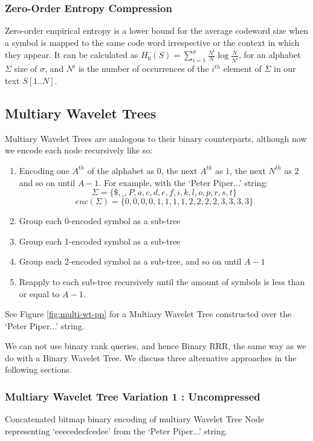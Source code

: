 \subsubsection{Zero-Order Entropy Compression}
\label{sec:entropy}
Zero-order empirical entropy is a lower bound for the average codeword size
when a symbol is mapped to the same code word irrespective or the context in
which they appear. It can be calculated as $H_0(S) = \sum_{i = 1}^{\sigma}
\frac{N^i}{N} \log \frac{N}{N^i}$, for an alphabet $\Sigma$ size of $\sigma$, 
and $N^i$ is the number of occurrences of the $i^{th}$ element of $\Sigma$ in 
our text $S[1..N]$. 



\clearpage
\subsection{Multiary Wavelet Trees}
Multiary Wavelet Trees are analogous to their binary counterparts, although now we encode each node recursively like so:

\begin{enumerate}
    \item Encoding one $A^{th}$ of the alphabet as $0$, the next $A^{th}$ as 
		$1$, the next $N^{th}$ as $2$ and so on until $A-1$. For example, with 
		the `Peter Piper...' string:
		$$\Sigma = \{ \$, \_, P, a, c, d, e, f, i, k, l, o, p, r, s, t \}$$
	   	$$enc(\Sigma) = \{  0,  0, 0, 0, 1, 1, 1, 1, 2, 2, 2, 2, 3, 3, 3, 3 \}$$
    \item Group each 0-encoded symbol as a sub-tree
    \item Group each 1-encoded symbol as a sub-tree
    \item Group each 2-encoded symbol as a sub-tree, and so on until $A-1$
    \item Reapply to each sub-tree recursively until the amount of symbols is
	less than or equal to $A - 1$.
\end{enumerate}

See Figure \ref{fig:multi-wt-pp} for a Multiary Wavelet Tree constructed over
the `Peter Piper...' string.

We can not use binary rank queries, and hence Binary RRR, the same way as we do 
with a Binary Wavelet Tree. We discuss three alternative approaches in the 
following sections.

\subsubsection{Multiary Wavelet Tree Variation 1 : Uncompressed}
		{Concatenated bitmap binary encoding of multiary Wavelet Tree Node
		representing `eeecedecfcedee' from the `Peter Piper...' string.}
		
